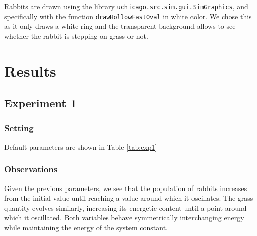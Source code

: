 \documentclass[11pt]{article}
\begin{document}
Rabbits are drawn using the library \texttt{uchicago.src.sim.gui.SimGraphics}, and specifically with the function \texttt{drawHollowFastOval} in white color. We chose this as it only draws a white ring and the transparent background allows to see whether the rabbit is stepping on grass or not.

\section{Results}

\subsection{Experiment 1}
\subsubsection{Setting}

Default parameters are shown in Table \ref{tab:exp1}

\subsubsection{Observations}

\begin{minipage}[]{\textwidth}

\begin{minipage}[]{0.2\textwidth}
\label{tab:exp1}
\end{minipage}{}
\hfill
\begin{minipage}[]{0.75\textwidth}
Given the previous parameters, we see that the population of rabbits increases from the initial value until reaching a value around which it oscillates. The grass quantity evolves similarly, increasing its energetic content until a point around which it oscillated. Both variables behave symmetrically interchanging energy while maintaining the energy of the system constant.   
\end{minipage}{}

\end{minipage}{}
\end{document}
